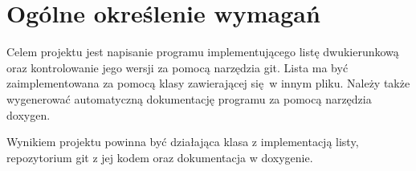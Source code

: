 	\newpage
\section{Ogólne określenie wymagań}		%

\hspace{0.60cm}

Celem projektu jest napisanie programu implementującego listę dwukierunkową oraz kontrolowanie jego wersji za pomocą narzędzia git. Lista ma być zaimplementowana za pomocą klasy zawierającej się w innym pliku. Należy także wygenerować automatyczną dokumentację programu za pomocą narzędzia doxygen.  

Wynikiem projektu powinna być działająca klasa z implementacją listy, repozytorium git z jej kodem oraz dokumentacja w doxygenie.
